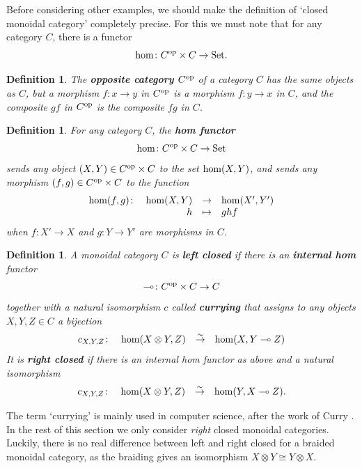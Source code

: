 \documentclass[12pt,twoside,openright]{report}
\newtheorem{definition}[thm]{Definition}
\newcommand{\Set}{\mathrm{Set}}
\newcommand{\maps}{\colon}
\newcommand{\isoto}{\stackrel{\sim}{\to}}
\newcommand{\lhom}{\multimap}
\renewcommand{\hom}{{\rm hom}}
\newcommand{\tensor}{\otimes}
\newcommand{\op}{{\rm op}}
\begin{document}
Before considering other examples, we should make the definition of `closed monoidal category' completely precise.  For this we must note that for any category $C$, there is a functor
\[            \hom \maps C^{\op} \times C \to \Set  .\]

\begin{definition} The {\bf opposite category} $C^{\op}$ of a category $C$ 
has the same objects as $C$, but a morphism $f \maps x \to y$ in $C^{\op}$ is a morphism $f \maps y \to x$ in $C$, and the composite $gf$ in
$C^{\op}$ is the composite $fg$ in $C$.  \end{definition}

\begin{definition} 
\label{hom.functor}
For any category $C$, the {\bf hom functor}
\[       \hom \maps C^\op \times C \to \Set  \]
sends any object $(X,Y) \in C^\op \times C$ to the set $\hom(X,Y)$, and sends any morphism $(f,g) \in C^\op \times C$ to the function
\[ 
\begin{array}{rrcl}
\hom(f,g) \maps & \hom(X,Y) & \to     & \hom(X',Y')\\
                & h         & \mapsto & ghf
\end{array}
\]
when $f\maps X' \to X$ and $g\maps Y \to Y'$ are morphisms in $C$.
\end{definition}

\begin{definition}
\label{closed.definition}
A monoidal category $C$ is {\bf left closed} if there is an
{\bf internal hom} functor
\[     \lhom \maps C^\op \times C \to C \]
together with a natural isomorphism $c$ called
{\bf currying} that assigns to any objects $X, Y, Z \in C$ 
a bijection
\[ \begin{array}{rrcl}
 c_{X,Y,Z} \maps & \hom(X\tensor Y, Z) & \isoto & \hom(X,Y \lhom Z)  
\end{array}
\]
It is {\bf right closed} if there is an internal hom functor as above and a natural isomorphism
\[ \begin{array}{rrcl}
 c_{X,Y,Z} \maps & \hom(X\tensor Y, Z) & \isoto & \hom(Y,X \lhom Z) . 
\end{array}
\]
\end{definition}
\noindent The term `currying' is mainly used in computer science, after the work of Curry \cite{Curry}.  In the rest of this section we only consider {\it right} closed monoidal categories.   Luckily, there is no real difference between left and right closed for a braided monoidal category, as the braiding gives an isomorphism $X \tensor Y \cong Y \tensor X$.  
\end{document}

